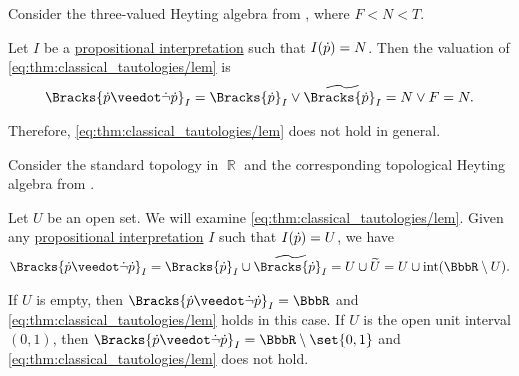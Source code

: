\begin{example}\label{ex:heyting_semantics_lem_counterexample}
  Consider the three-valued Heyting algebra from , where \( F < N < T \).

  Let \( I \) be a \hyperref[def:propositional_valuation]{propositional interpretation} such that \( I({\dot{p}}) = N \). Then the valuation of \eqref{eq:thm:classical_tautologies/lem} is
  \begin{equation*}
    \Bracks{\synp \synvee \synneg \synp}_I
    =
    \Bracks{\synp}_I \vee \widetilde{\Bracks{\synp}_I}
    =
    N \vee F
    =
    N.
  \end{equation*}

  Therefore, \eqref{eq:thm:classical_tautologies/lem} does not hold in general.
\end{example}

\begin{example}\label{ex:topological_semantics_lem_counterexample}
  Consider the standard topology in \( \BbbR \) and the corresponding topological Heyting algebra from .

  Let \( U \) be an open set. We will examine \eqref{eq:thm:classical_tautologies/lem}. Given any \hyperref[def:propositional_valuation]{propositional interpretation} \( I \) such that \( I({\dot{p}}) = U \), we have
  \begin{equation*}
    \Bracks{\synp \synvee \synneg \synp}_I
    =
    \Bracks{\synp}_I \cup \widetilde{\Bracks{\synp}_I}
    =
    U \cup \widetilde{U}
    =
    U \cup \Int(\BbbR \setminus U).
  \end{equation*}

  If \( U \) is empty, then \( \Bracks{\synp \synvee \synneg \synp}_I = \BbbR \) and \eqref{eq:thm:classical_tautologies/lem} holds in this case. If \( U \) is the open unit interval \( (0, 1) \), then \( \Bracks{\synp \synvee \synneg \synp}_I = \BbbR \setminus \set{ 0, 1 } \) and \eqref{eq:thm:classical_tautologies/lem} does not hold.
\end{example}

